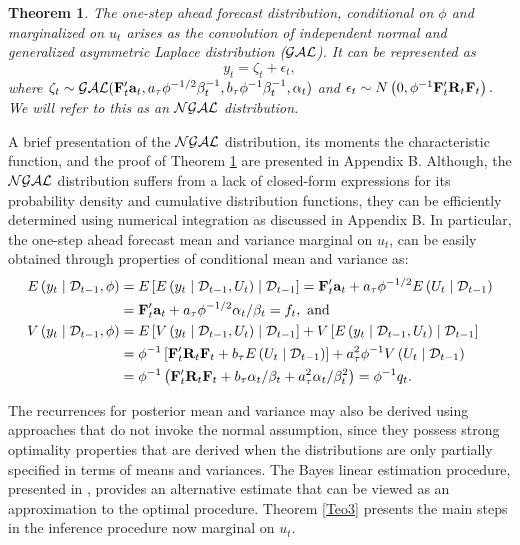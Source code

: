 \documentclass[12pt,a4paper]{article}\usepackage[]{graphicx}\usepackage[]{color}\usepackage{subfigure}
\newtheorem{myth}{Theorem}[section]
\newcommand{\mathD}{\mathcal{D}}
\begin{document}
 \begin{myth}\label{NGAL}
  The one-step ahead forecast distribution, conditional on $\phi$ and marginalized on $u_t$ arises as the convolution of independent normal and generalized asymmetric Laplace distribution ($\cal{GAL}$). 
  It can be represented as
  $$
  y_t =\zeta_t + \epsilon_t,
  $$
  where $\zeta_t\sim \mathcal{GAL}({\bf F}_t'{\bf a}_{t},a_{\tau}\phi^{-1/2}\beta_t^{-1},b_{\tau}\phi^{-1}\beta_t^{-1},\alpha_t)$ 
   and $\epsilon_t\sim N\left(0,\phi^{-1}{\bf F}_t'{\bf R}_{t} {\bf F}_t\right).$ We will refer to this as an $\cal{NGAL}$ distribution. 
 \end{myth}
   
 A brief presentation of the $\cal{NGAL}$ distribution, its moments the characteristic function, and the proof of Theorem \ref{NGAL} are presented in Appendix B. 
 Although, the $\cal{NGAL}$ distribution suffers from a lack of closed-form expressions for its probability density and cumulative distribution functions, they can be efficiently determined using numerical integration as discussed in Appendix B. 
 In particular, the one-step ahead forecast mean and variance marginal on $u_t$, can  be easily obtained through properties of conditional mean and variance as:
\begin{align*} 
E\left(y_t\mid \mathD_{t-1},\phi\right)&=E\left[E\left(y_t\mid \mathD_{t-1},U_t\right)\mid \mathD_{t-1}\right] = {\bf F}_t'{\bf a}_t + a_{\tau}\phi^{-1/2}E\left(U_t\mid \mathD_{t-1}\right)\\
& = {\bf F}_t'{\bf a}_t + a_{\tau}\phi^{-1/2}\alpha_t/\beta_t = f_t, \mbox{ and}\\
V\left(y_t\mid\mathD_{t-1},\phi\right) &= E\left[V\left(y_t\mid \mathD_{t-1},U_t\right)\mid \mathD_{t-1}\right] + V\left[E\left(y_t\mid \mathD_{t-1},U_t\right)\mid \mathD_{t-1}\right] \\
& = \phi^{-1}\left[{\bf F}_t'{\bf R}_{t} {\bf F}_t + b_{\tau}E\left(U_t\mid \mathD_{t-1}\right)\right]+a_\tau^2\phi^{-1}V\left(U_t\mid \mathD_{t-1}\right)\\
& = \phi^{-1}\left({\bf F}_t'{\bf R}_{t} {\bf F}_t + b_{\tau}\alpha_t/\beta_t+a_\tau^2\alpha_t/\beta_t^2\right)=\phi^{-1}q_t.
\end{align*}



The recurrences for posterior mean and variance may also be derived using approaches that do not invoke the normal assumption, since they possess 
strong optimality properties that are derived when the distributions are only partially specified in terms of means and variances. The Bayes linear estimation procedure, presented in \cite[Chap. 4]{west1997}, provides an alternative estimate that can be viewed as an approximation to the optimal procedure. 
Theorem \ref{Teo3} presents the main steps in the inference procedure now marginal on $u_t$. 
\end{document}
